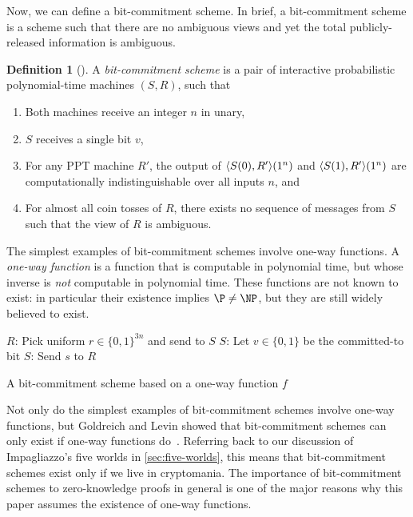 \documentclass[english,12pt]{reedthesis}
\theoremstyle{plain}
\theoremstyle{definition}
\newtheorem{defn}[defn]{Definition}
\theoremstyle{remark}
\DeclarePairedDelimiter{\abs}{\lvert}{\rvert}
\DeclarePairedDelimiter{\ang}{\langle}{\rangle}
\begin{document}
Now, we can define a bit-commitment scheme. In brief, a bit-commitment scheme is
a scheme such that there are no ambiguous views and yet the total
publicly-released information is ambiguous.

\begin{defn}[{\cite[Def.\ 4.4.1]{Go01}}]\label{def:commitment-scheme}
  A \emph{bit-commitment scheme} is a pair of interactive probabilistic
  polynomial-time machines $(S, R)$, such that
  \begin{enumerate}
    \item Both machines receive an integer $n$ in unary,
    \item $S$ receives a single bit $v$,
    \item For any PPT machine $R'$, the output of $\ang{S(0), R'}(1^{n})$ and
          $\ang{S(1), R'}(1^{n})$ are computationally indistinguishable over all
          inputs $n$, and
    \item For almost all coin tosses of $R$, there exists no sequence of
          messages from $S$ such that the view of $R$ is ambiguous.
  \end{enumerate}
\end{defn}

The simplest examples of bit-commitment schemes involve one-way
functions. A \emph{one-way function} is a function that
is computable in polynomial time, but whose inverse is \emph{not} computable in
polynomial time. These functions are not known to exist: in particular their
existence implies $\P \ne \NP$, but they are still widely believed to exist.

\begin{algorithm}[htbp]
  $R$: Pick uniform $r \in \{0, 1\}^{3n}$ and send to $S$\;
  $S$: Let $v \in \{0, 1\}$ be the committed-to bit\;
  $S$: Send $s$ to $R$\;
  \caption{A bit-commitment scheme based on a one-way function
    $f$}\label{alg:bit-commit}
\end{algorithm}

Not only do the simplest examples of bit-commitment schemes involve one-way
functions, but Goldreich and Levin showed that bit-commitment schemes can only
exist if one-way functions do~\cite{GL89}. Referring back to our discussion of
Impagliazzo's five worlds in \cref{sec:five-worlds}, this means that
bit-commitment schemes exist only if we live in cryptomania. The importance of
bit-commitment schemes to zero-knowledge proofs in general is one of the major
reasons why this paper assumes the existence of one-way functions.
\end{document}
